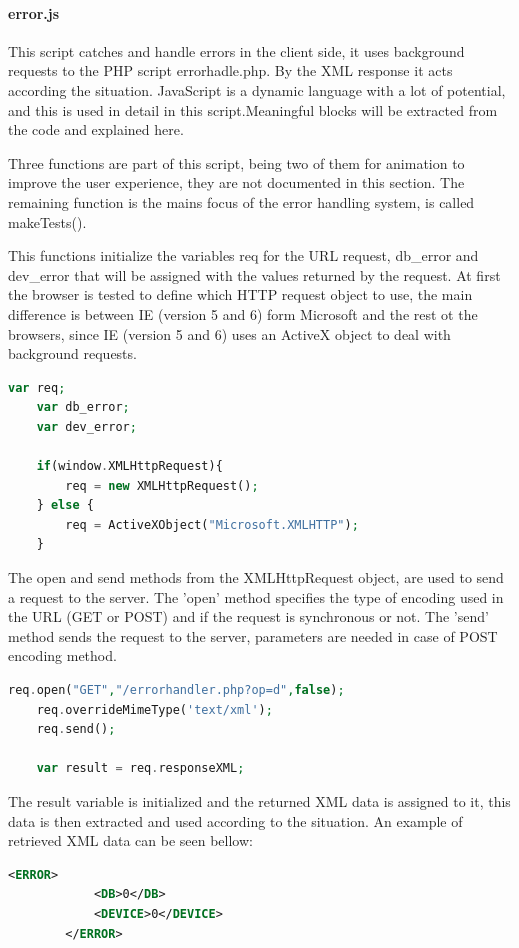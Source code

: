 \paragraph{error.js}
This script catches and handle errors in the client side, it uses background requests to the PHP script errorhadle.php. By the XML response it acts according the situation. JavaScript is a dynamic language with a lot of potential, and this is used in detail in this script.Meaningful blocks will be extracted from the code and explained here.

Three functions are part of this script, being two of them for animation to improve the user experience, they are not documented in this section. The remaining function is the mains focus of the error handling system, is called makeTests().

This functions initialize the variables req for the URL request, db\_error and dev\_error that will be assigned with the values returned by the request.
At first the browser is tested to define which HTTP request object to use, the main difference is between IE (version 5 and 6) form Microsoft and the rest ot the browsers, since IE (version 5 and 6) uses an ActiveX object to deal with background requests.
\begin{lstlisting}[language=php]
	var req;
	var db_error;
	var dev_error;
	
	if(window.XMLHttpRequest){
		req	= new XMLHttpRequest();
	} else {
		req = ActiveXObject("Microsoft.XMLHTTP");	
	}
\end{lstlisting}

The open and send methods from the XMLHttpRequest object, are used to send a request to the server. The 'open' method specifies the type of encoding used in the URL (GET or POST) and if the request is synchronous or not. The 'send' method sends the request to the server, parameters are needed in case of POST encoding method. 

\begin{lstlisting}[language=php]
	req.open("GET","/errorhandler.php?op=d",false);
	req.overrideMimeType('text/xml');
	req.send();
	
	var result = req.responseXML;
\end{lstlisting}

The result variable is initialized and the returned XML data is assigned to it, this data is then extracted and used according to the situation. An example of retrieved XML data can be seen bellow:

\begin{lstlisting}[language=xml]
		<ERROR>
			<DB>0</DB>
			<DEVICE>0</DEVICE>
		</ERROR>
\end{lstlisting}

